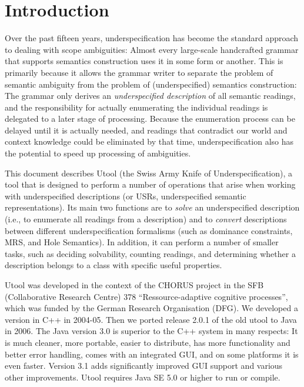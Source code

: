 
\section{Introduction}  \label{sec:introduction}

Over the past fifteen years, underspecification has become the
standard approach to dealing with scope ambiguities: Almost every
large-scale handcrafted grammar that supports semantics construction
uses it in some form or another. This is primarily because it allows
the grammar writer to separate the problem of semantic ambiguity from
the problem of (underspecified) semantics construction: The grammar
only derives an \emph{underspecified description} of all semantic
readings, and the responsibility for actually enumerating the
individual readings is delegated to a later stage of
processing. Because the enumeration process can be delayed until it is
actually needed, and readings that contradict our world and context
knowledge could be eliminated by that time, underspecification also
has the potential to speed up processing of ambiguities.

This document describes Utool (the Swiss Army Knife of
Underspecification), a tool that is designed to perform a number of
operations that arise when working with underspecified descriptions
(or USRs, underspecified semantic representations). Its main two
functions are to \emph{solve} an underspecified description (i.e., to
enumerate all readings from a description) and to \emph{convert}
descriptions between different underspecification formalisms (such as
dominance constraints, MRS, and Hole Semantics). In addition, it can
perform a number of smaller tasks, such as deciding solvability,
counting readings, and determining whether a description belongs to a
class with specific useful properties.

Utool was developed in the context of the CHORUS project in the SFB
(Collaborative Research Centre) 378 ``Ressource-adaptive cognitive
processes'', which was funded by the German Research Organisation
(DFG). We developed a version in C++ in 2004-05. Then we ported
release 2.0.1 of the old utool to Java in 2006. The Java version 3.0
is superior to the C++ system in many respects: It is much cleaner,
more portable, easier to distribute, has more functionality and better
error handling, comes with an integrated GUI, and on some platforms it
is even faster. Version 3.1 adds significantly improved GUI support and various other improvements. Utool requires Java SE 5.0 or higher to run or
compile.

